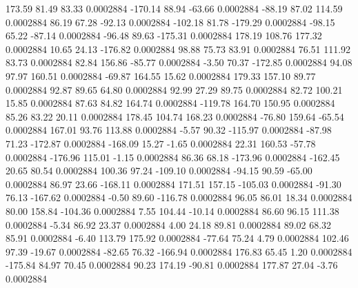       173.59       81.49       83.33     0.0002884
     -170.14       88.94      -63.66     0.0002884
      -88.19       87.02      114.59     0.0002884
       86.19       67.28      -92.13     0.0002884
     -102.18       81.78     -179.29     0.0002884
      -98.15       65.22      -87.14     0.0002884
      -96.48       89.63     -175.31     0.0002884
      178.19      108.76      177.32     0.0002884
       10.65       24.13     -176.82     0.0002884
       98.88       75.73       83.91     0.0002884
       76.51      111.92       83.73     0.0002884
       82.84      156.86      -85.77     0.0002884
       -3.50       70.37     -172.85     0.0002884
       94.08       97.97      160.51     0.0002884
      -69.87      164.55       15.62     0.0002884
      179.33      157.10       89.77     0.0002884
       92.87       89.65       64.80     0.0002884
       92.99       27.29       89.75     0.0002884
       82.72      100.21       15.85     0.0002884
       87.63       84.82      164.74     0.0002884
     -119.78      164.70      150.95     0.0002884
       85.26       83.22       20.11     0.0002884
      178.45      104.74      168.23     0.0002884
      -76.80      159.64      -65.54     0.0002884
      167.01       93.76      113.88     0.0002884
       -5.57       90.32     -115.97     0.0002884
      -87.98       71.23     -172.87     0.0002884
     -168.09       15.27       -1.65     0.0002884
       22.31      160.53      -57.78     0.0002884
     -176.96      115.01       -1.15     0.0002884
       86.36       68.18     -173.96     0.0002884
     -162.45       20.65       80.54     0.0002884
      100.36       97.24     -109.10     0.0002884
      -94.15       90.59      -65.00     0.0002884
       86.97       23.66     -168.11     0.0002884
      171.51      157.15     -105.03     0.0002884
      -91.30       76.13     -167.62     0.0002884
       -0.50       89.60     -116.78     0.0002884
       96.05       86.01       18.34     0.0002884
       80.00      158.84     -104.36     0.0002884
        7.55      104.44      -10.14     0.0002884
       86.60       96.15      111.38     0.0002884
       -5.34       86.92       23.37     0.0002884
        4.00       24.18       89.81     0.0002884
       89.02       68.32       85.91     0.0002884
       -6.40      113.79      175.92     0.0002884
      -77.64       75.24        4.79     0.0002884
      102.46       97.39      -19.67     0.0002884
      -82.65       76.32     -166.94     0.0002884
      176.83       65.45        1.20     0.0002884
     -175.84       84.97       70.45     0.0002884
       90.23      174.19      -90.81     0.0002884
      177.87       27.04       -3.76     0.0002884
